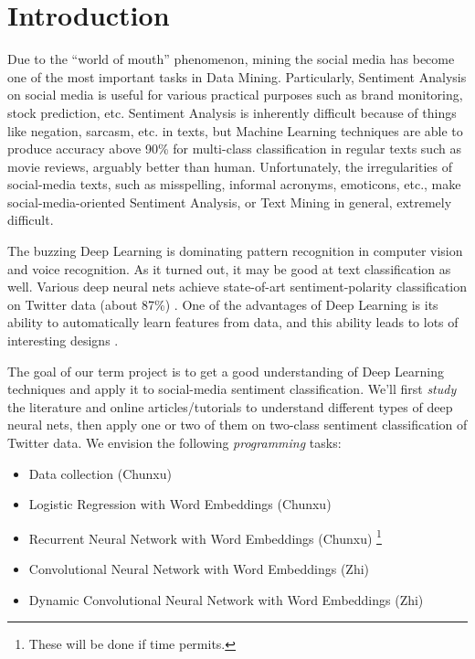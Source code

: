 \section{Introduction}

Due to the ``world of mouth'' phenomenon, mining the social media has become one of the most important tasks in Data Mining. Particularly, Sentiment Analysis on social media is useful for various practical purposes such as brand monitoring, stock prediction, etc. 
Sentiment Analysis is inherently difficult because of things like negation, sarcasm, etc. in texts, but Machine Learning techniques are able to produce accuracy above 90\% for multi-class classification in regular texts such as movie reviews, arguably better than human. Unfortunately, the irregularities of social-media texts, such as misspelling, informal acronyms, emoticons, etc., make social-media-oriented Sentiment Analysis, or Text Mining in general, extremely difficult. 

The buzzing Deep Learning is dominating pattern recognition in computer vision and voice recognition. As it turned out, it may be good at text classification as well. Various deep neural nets achieve state-of-art sentiment-polarity classification on Twitter data (about 87\%) \cite{kalchbrenner2014, kim2014, wang2015}. One of the advantages of Deep Learning is its ability to automatically learn features from data, and this ability leads to lots of interesting designs \cite{dos2014, kalchbrenner2014, kim2014, socher2013, wang2015}.

The goal of our term project is to get a good understanding of Deep Learning techniques and apply it to social-media sentiment classification. We'll first {\em study} the literature and online articles/tutorials to understand different types of deep neural nets, then apply one or two of them on two-class sentiment classification of Twitter data. We envision the following {\em programming} tasks:
\begin{itemize}
\item Data collection (Chunxu)
\item Logistic Regression with Word Embeddings (Chunxu)
\item Recurrent Neural Network with Word Embeddings (Chunxu) \footnote{\label{ext}These will be done if time permits.}
\item Convolutional Neural Network with Word Embeddings (Zhi)
\item Dynamic Convolutional Neural Network with Word Embeddings (Zhi) 
\end{itemize}
